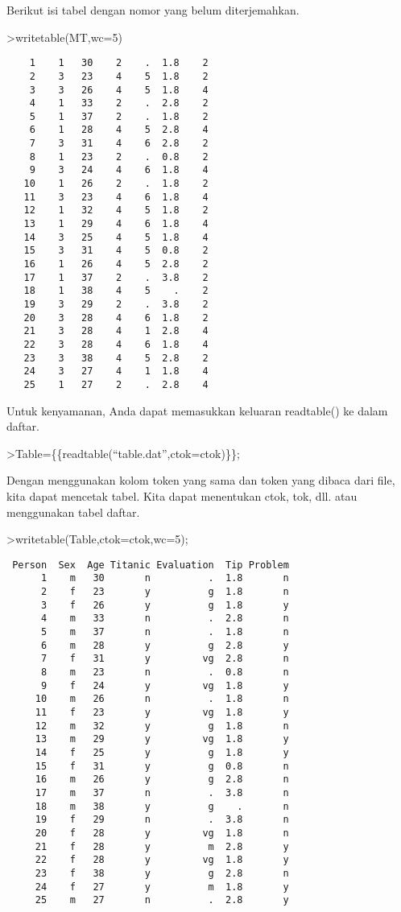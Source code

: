 \documentclass[
]{book}
\begin{document}
Berikut isi tabel dengan nomor yang belum diterjemahkan.

\textgreater writetable(MT,wc=5)

\begin{verbatim}
    1    1   30    2    .  1.8    2
    2    3   23    4    5  1.8    2
    3    3   26    4    5  1.8    4
    4    1   33    2    .  2.8    2
    5    1   37    2    .  1.8    2
    6    1   28    4    5  2.8    4
    7    3   31    4    6  2.8    2
    8    1   23    2    .  0.8    2
    9    3   24    4    6  1.8    4
   10    1   26    2    .  1.8    2
   11    3   23    4    6  1.8    4
   12    1   32    4    5  1.8    2
   13    1   29    4    6  1.8    4
   14    3   25    4    5  1.8    4
   15    3   31    4    5  0.8    2
   16    1   26    4    5  2.8    2
   17    1   37    2    .  3.8    2
   18    1   38    4    5    .    2
   19    3   29    2    .  3.8    2
   20    3   28    4    6  1.8    2
   21    3   28    4    1  2.8    4
   22    3   28    4    6  1.8    4
   23    3   38    4    5  2.8    2
   24    3   27    4    1  1.8    4
   25    1   27    2    .  2.8    4
\end{verbatim}

Untuk kenyamanan, Anda dapat memasukkan keluaran readtable() ke dalam daftar.

\textgreater Table=\{\{readtable(``table.dat'',ctok=ctok)\}\};

Dengan menggunakan kolom token yang sama dan token yang dibaca dari file, kita dapat mencetak tabel. Kita dapat menentukan ctok, tok, dll. atau menggunakan tabel daftar.

\textgreater writetable(Table,ctok=ctok,wc=5);

\begin{verbatim}
 Person  Sex  Age Titanic Evaluation  Tip Problem
      1    m   30       n          .  1.8       n
      2    f   23       y          g  1.8       n
      3    f   26       y          g  1.8       y
      4    m   33       n          .  2.8       n
      5    m   37       n          .  1.8       n
      6    m   28       y          g  2.8       y
      7    f   31       y         vg  2.8       n
      8    m   23       n          .  0.8       n
      9    f   24       y         vg  1.8       y
     10    m   26       n          .  1.8       n
     11    f   23       y         vg  1.8       y
     12    m   32       y          g  1.8       n
     13    m   29       y         vg  1.8       y
     14    f   25       y          g  1.8       y
     15    f   31       y          g  0.8       n
     16    m   26       y          g  2.8       n
     17    m   37       n          .  3.8       n
     18    m   38       y          g    .       n
     19    f   29       n          .  3.8       n
     20    f   28       y         vg  1.8       n
     21    f   28       y          m  2.8       y
     22    f   28       y         vg  1.8       y
     23    f   38       y          g  2.8       n
     24    f   27       y          m  1.8       y
     25    m   27       n          .  2.8       y
\end{verbatim}
\end{document}
